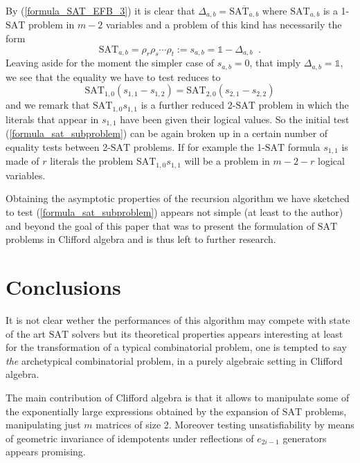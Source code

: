 \documentclass[a4paper,twoside,11pt]{article}
\begin{document}
By (\ref{formula_SAT_EFB_3}) it is clear that $\Delta_{a,b} = {\overline{{{\ensuremath{\mbox{SAT}}}_{a,b}}}}$ where ${\ensuremath{\mbox{SAT}}}_{a,b}$ is a 1-{\ensuremath{\mbox{SAT}}}{} problem in $m-2$ variables and a problem of this kind has necessarily the form
$$
{\ensuremath{\mbox{SAT}}}_{a,b} =  {\ensuremath{\rho}}_r {\ensuremath{\rho}}_s \cdots {\ensuremath{\rho}}_t := s_{a,b} = {\ensuremath{\mathbb{1}}} - \Delta_{a,b} {\;\; \mathrm{.}}
$$
Leaving aside for the moment the simpler case of $s_{a,b} = 0$, that imply $\Delta_{a,b} = {\ensuremath{\mathbb{1}}}$, we see that the equality we have to test reduces to
$$
{\ensuremath{\mbox{SAT}}}_{1,0} (s_{1,1} - s_{1,2}) = {\ensuremath{\mbox{SAT}}}_{2,0} (s_{2,1} - s_{2,2})
$$
and we remark that ${\ensuremath{\mbox{SAT}}}_{1,0} s_{1,1}$ is a further reduced 2-{\ensuremath{\mbox{SAT}}}{} problem in which the literals that appear in $s_{1,1}$ have been given their logical values. So the initial test (\ref{formula_sat_subproblem}) can be again broken up in a certain number of equality tests between 2-{\ensuremath{\mbox{SAT}}}{} problems. If for example the 1-{\ensuremath{\mbox{SAT}}}{} formula $s_{1,1}$ is made of $r$ literals the problem ${\ensuremath{\mbox{SAT}}}_{1,0} s_{1,1}$ will be a problem in $m - 2 - r$ logical variables.

Obtaining the asymptotic properties of the recursion algorithm we have sketched to test (\ref{formula_sat_subproblem}) appears not simple (at least to the author) and beyond the goal of this paper that was to present the formulation of {\ensuremath{\mbox{SAT}}}{} problems in Clifford algebra and is thus left to further research.

\section{Conclusions}
\label{Conclusions}
It is not clear wether the performances of this algorithm may compete with state of the art {\ensuremath{\mbox{SAT}}}{} solvers but its theoretical properties appears interesting at least for the transformation of a typical combinatorial problem, one is tempted to say \emph{the} archetypical combinatorial problem, in a purely algebraic setting in Clifford algebra.

The main contribution of Clifford algebra is that it allows to manipulate some of the exponentially large expressions obtained by the expansion of {\ensuremath{\mbox{SAT}}}{} problems, manipulating just $m$ matrices of size 2. Moreover testing unsatisfiability by means of geometric invariance of idempotents under reflections of ${e}_{2 i - 1}$ generators appears promising.
\end{document}
